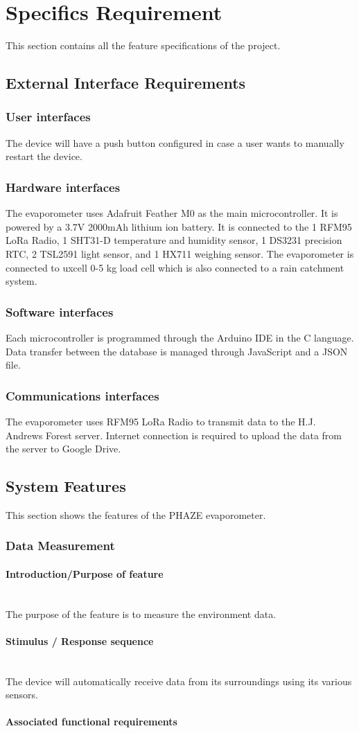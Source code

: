 \documentclass[onecolumn, draftclsnofoot,10pt, compsoc]{IEEEtran}
\newcommand{\subsubsubsection}[1]{\paragraph{#1}\mbox{}\\}
\begin{document}
\section{Specifics Requirement}
This section contains all the feature specifications of the project.

\subsection{External Interface Requirements}
\subsubsection{User interfaces}
The device will have a push button configured in case a user wants to manually restart the device.

\subsubsection{Hardware interfaces}
The evaporometer uses Adafruit Feather M0 as the main microcontroller. It is powered by a 3.7V 2000mAh lithium ion battery. It is connected to the 1 RFM95 LoRa Radio, 1 SHT31-D temperature and humidity sensor, 1 DS3231 precision RTC, 2 TSL2591 light sensor, and 1 HX711 weighing sensor. The evaporometer is connected to uxcell 0-5 kg load cell which is also connected to a rain catchment system.

\subsubsection{Software interfaces}
Each microcontroller is programmed through the Arduino IDE in the C language.  Data transfer between the database is managed through JavaScript and a JSON file.

\subsubsection{Communications interfaces}
The evaporometer uses RFM95 LoRa Radio to transmit data to the H.J. Andrews Forest server. 
Internet connection is required to upload the data from the server to Google Drive.

\subsection{System Features}
This section shows the features of the PHAZE evaporometer.
\subsubsection{Data Measurement}
\subsubsubsection{Introduction/Purpose of feature}
The purpose of the feature is to measure the environment data. 
\subsubsubsection{Stimulus / Response sequence}
The device will automatically receive data from its surroundings using its various sensors. 
\subsubsubsection{Associated functional requirements}
\end{document}
